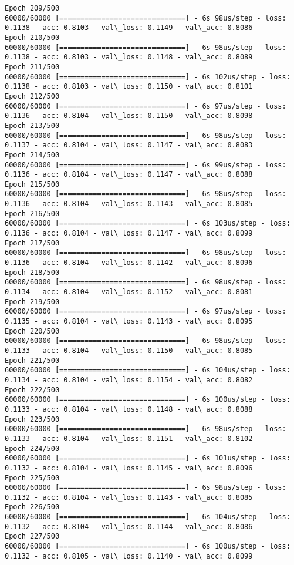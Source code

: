 \documentclass[11pt]{article}
\begin{document}
\begin{Verbatim}[commandchars=\\\{\}]
Epoch 209/500
60000/60000 [==============================] - 6s 98us/step - loss: 0.1138 - acc: 0.8103 - val\_loss: 0.1149 - val\_acc: 0.8086
Epoch 210/500
60000/60000 [==============================] - 6s 98us/step - loss: 0.1138 - acc: 0.8103 - val\_loss: 0.1148 - val\_acc: 0.8089
Epoch 211/500
60000/60000 [==============================] - 6s 102us/step - loss: 0.1138 - acc: 0.8103 - val\_loss: 0.1150 - val\_acc: 0.8101
Epoch 212/500
60000/60000 [==============================] - 6s 97us/step - loss: 0.1136 - acc: 0.8104 - val\_loss: 0.1150 - val\_acc: 0.8098
Epoch 213/500
60000/60000 [==============================] - 6s 98us/step - loss: 0.1137 - acc: 0.8104 - val\_loss: 0.1147 - val\_acc: 0.8083
Epoch 214/500
60000/60000 [==============================] - 6s 99us/step - loss: 0.1136 - acc: 0.8104 - val\_loss: 0.1147 - val\_acc: 0.8088
Epoch 215/500
60000/60000 [==============================] - 6s 98us/step - loss: 0.1136 - acc: 0.8104 - val\_loss: 0.1143 - val\_acc: 0.8085
Epoch 216/500
60000/60000 [==============================] - 6s 103us/step - loss: 0.1136 - acc: 0.8104 - val\_loss: 0.1147 - val\_acc: 0.8099
Epoch 217/500
60000/60000 [==============================] - 6s 98us/step - loss: 0.1136 - acc: 0.8104 - val\_loss: 0.1142 - val\_acc: 0.8096
Epoch 218/500
60000/60000 [==============================] - 6s 98us/step - loss: 0.1134 - acc: 0.8104 - val\_loss: 0.1152 - val\_acc: 0.8081
Epoch 219/500
60000/60000 [==============================] - 6s 97us/step - loss: 0.1135 - acc: 0.8104 - val\_loss: 0.1143 - val\_acc: 0.8095
Epoch 220/500
60000/60000 [==============================] - 6s 98us/step - loss: 0.1133 - acc: 0.8104 - val\_loss: 0.1150 - val\_acc: 0.8085
Epoch 221/500
60000/60000 [==============================] - 6s 104us/step - loss: 0.1134 - acc: 0.8104 - val\_loss: 0.1154 - val\_acc: 0.8082
Epoch 222/500
60000/60000 [==============================] - 6s 100us/step - loss: 0.1133 - acc: 0.8104 - val\_loss: 0.1148 - val\_acc: 0.8088
Epoch 223/500
60000/60000 [==============================] - 6s 98us/step - loss: 0.1133 - acc: 0.8104 - val\_loss: 0.1151 - val\_acc: 0.8102
Epoch 224/500
60000/60000 [==============================] - 6s 101us/step - loss: 0.1132 - acc: 0.8104 - val\_loss: 0.1145 - val\_acc: 0.8096
Epoch 225/500
60000/60000 [==============================] - 6s 98us/step - loss: 0.1132 - acc: 0.8104 - val\_loss: 0.1143 - val\_acc: 0.8085
Epoch 226/500
60000/60000 [==============================] - 6s 104us/step - loss: 0.1132 - acc: 0.8104 - val\_loss: 0.1144 - val\_acc: 0.8086
Epoch 227/500
60000/60000 [==============================] - 6s 100us/step - loss: 0.1132 - acc: 0.8105 - val\_loss: 0.1140 - val\_acc: 0.8099

\end{Verbatim}
\end{document}
